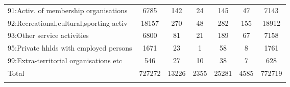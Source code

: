 {\begin{longtable}{l*{6}{c}}
91:Activ. of membership organisations&     6785&      142&       24&      145&       47&     7143\\
92:Recreational,cultural,sporting activ&    18157&      270&       48&      282&      155&    18912\\
93:Other service activities&     6800&       81&       21&      189&       67&     7158\\
95:Private hhlds with employed persons&     1671&       23&        1&       58&        8&     1761\\
99:Extra-territorial organisations etc&      546&       27&       10&       38&        7&      628\\
Total     &   727272&    13226&     2355&    25281&     4585&   772719\\
\hline\hline
\label{tab:2D_industries}
\end{longtable}
}
